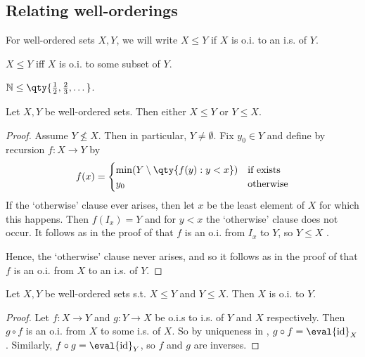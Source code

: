 \subsection{Relating well-orderings}
\begin{definition}
    For well-ordered sets $X, Y$, we will write $X \leq Y$ if $X$ is o.i. to an i.s. of $Y$.
\end{definition}

$X \leq Y$ iff $X$ is o.i. to some subset of $Y$.

\begin{example}
    $\mathbb N \leq \qty{\frac{1}{2}, \frac{2}{3}, \dots}$.

\end{example}
\begin{proposition} \label{thm:2.6}
    Let $X, Y$ be well-ordered sets.
    Then either $X \leq Y$ or $Y \leq X$.
\end{proposition}

\begin{proof}
    Assume $Y \nleq X$.
    Then in particular, $Y \neq \emptyset$.
    Fix $y_0 \in Y$ and define by recursion $f \colon X \to Y$ by
    \begin{align*}
        f(x) = \begin{cases}
            \min (Y \setminus \qty{f(y) : y < x}) & \text{if exists} \\
            y_0 & \text{otherwise}
        \end{cases}
    \end{align*}
    If the `otherwise' clause ever arises, then let $x$ be the least element of $X$ for which this happens.
    Then $f(I_x) = Y$ and for $y < x$ the `otherwise' clause does not occur.
    It follows as in the proof of  that $f$ is an o.i. from $I_x$ to $Y$, so $Y \leq X$ \Lightning.

    Hence, the `otherwise' clause never arises, and so it follows as in the proof of  that $f$ is an o.i. from $X$ to an i.s. of $Y$.
\end{proof}

\begin{proposition}
    Let $X, Y$ be well-ordered sets s.t. $X \leq Y$ and $Y \leq X$.
    Then $X$ is o.i. to $Y$.
\end{proposition}

\begin{proof}
    Let $f \colon X \to Y$ and $g \colon Y \to X$ be o.i.s to i.s. of $Y$ and $X$ respectively.
    Then $g \circ f$ is an o.i. from $X$ to some i.s. of $X$.
    So by uniqueness in , $g \circ f = \eval{\operatorname{id}}_X$.
    Similarly, $f \circ g = \eval{\operatorname{id}}_Y$, so $f$ and $g$ are inverses.
\end{proof}

